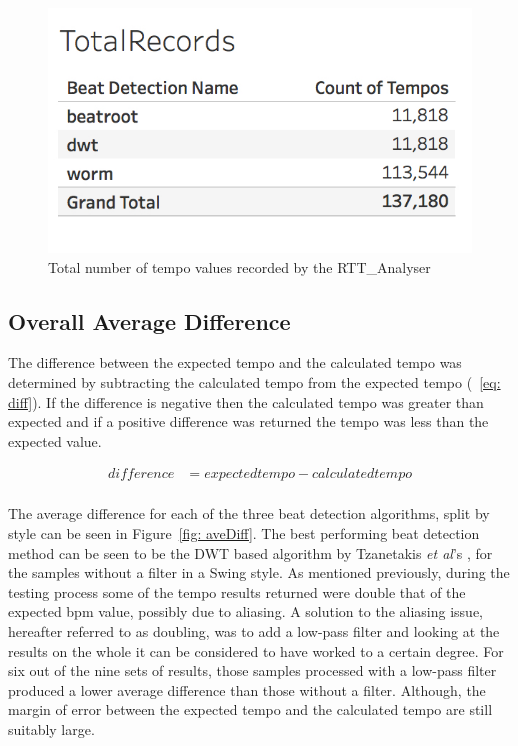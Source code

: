 \documentclass[a4paper, 11pt]{article}
\begin{document}
\begin{figure}[htbp]
\centering
\includegraphics[scale=0.3]{totRec.jpg}
\caption{Total number of tempo values recorded by the RTT\_Analyser}
\label{fig: totrec}
\end{figure}

\subsection{Overall Average Difference}
The difference between the expected tempo and the calculated tempo was determined by subtracting the calculated tempo from the expected tempo (~\ref{eq: diff}). If the difference is negative then the calculated tempo was greater than expected and if a positive difference was returned the tempo was less than the expected value.

\begin{equation}\label{eq: diff}
\begin{split}
difference& =expected tempo - calculated tempo\\
\end{split}
\end{equation}

The average difference for each of the three beat detection algorithms, split by style can be seen in Figure~\ref{fig: aveDiff}. The best performing beat detection method can be seen to be the DWT based algorithm by Tzanetakis \textit{et al}'s \cite{tzane1}, for the samples without a filter in a Swing style. As mentioned previously, during the testing process some of the tempo results returned were double that of the expected bpm value, possibly due to aliasing. A solution to the aliasing issue, hereafter referred to as doubling, was to add a low-pass filter and looking at the results on the whole it can be considered to have worked to a certain degree. For six out of the nine sets of results, those samples processed with a low-pass filter produced a lower average difference than those without a filter. Although, the margin of error between the expected tempo and the calculated tempo are still suitably large.\par
\end{document}
